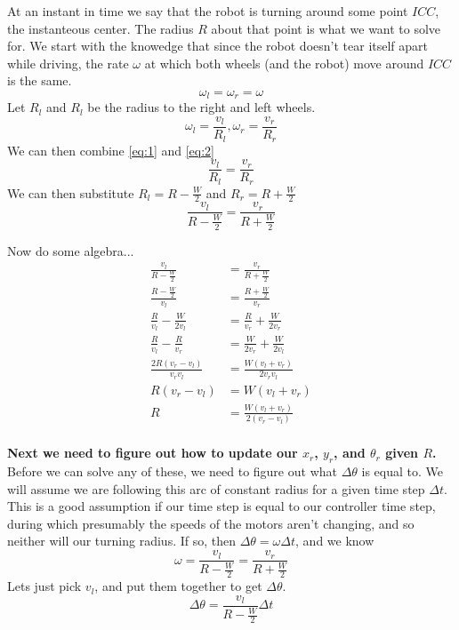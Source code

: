 \documentclass{article}
\begin{document}
At an instant in time we say that the robot is turning around some point $ICC$, the instanteous center. The radius $R$ about that point is what we want to solve for. We start with the knowedge that since the robot doesn't tear itself apart while driving, the rate $\omega$ at which both wheels (and the robot) move around $ICC$ is the same.
\begin{equation} \label{eq:1}
  \omega_l = \omega_r = \omega
\end{equation}
Let $R_l$ and $R_l$ be the radius to the right and left wheels.
\begin{equation} \label{eq:2}
  \omega_l = \frac{v_l}{R_l}, \omega_r = \frac{v_r}{R_r}
\end{equation}
We can then combine \ref{eq:1} and \ref{eq:2}
\begin{equation}
  \frac{v_l}{R_l} = \frac{v_r}{R_r}
\end{equation}
We can then substitute $R_l = R - \frac{W}{2}$ and $R_r = R + \frac{W}{2}$
\begin{equation}
  \frac{v_l}{R-\frac{W}{2}} = \frac{v_r}{R + \frac{W}{2}}
\end{equation}

Now do some algebra...
\begin{align*}
  \frac{v_l}{R-\frac{W}{2}} &= \frac{v_r}{R + \frac{W}{2}} \\[1em]
  \frac{R-\frac{W}{2}}{v_l} &= \frac{R + \frac{W}{2}}{v_r} \\[1em]
  \frac{R}{v_l}-\frac{W}{2v_l} &= \frac{R}{v_r} + \frac{W}{2v_r} \\[1em]
  \frac{R}{v_l}-\frac{R}{v_r} &= \frac{W}{2v_r}+\frac{W}{2v_l} \\[1em]
  \frac{2R(v_r-v_l)}{v_rv_l} &= \frac{W(v_l+v_r)}{2v_rv_l} \\[1em]
  R(v_r-v_l) &= W(v_l+v_r) \\[1em]
  R &= \frac{W(v_l+v_r)}{2(v_r-v_l)} \\[1em]
\end{align*}

\textbf{Next we need to figure out how to update our $x_r$, $y_r$, and $\theta_r$ given $R$.} \\

Before we can solve any of these, we need to figure out what $\Delta\theta$ is equal to. We will assume we are following this arc of constant radius for a given time step $\Delta t$. This is a good assumption if our time step is equal to our controller time step, during which presumably the speeds of the motors aren't changing, and so neither will our turning radius. If so, then $\Delta\theta = \omega\Delta t$, and we know
$$\omega=\dfrac{v_l}{R-\frac{W}{2}} = \dfrac{v_r}{R+\frac{W}{2}}$$
Lets just pick $v_l$, and put them together to get $\Delta\theta$.
$$\Delta\theta = \dfrac{v_l}{R-\frac{W}{2}}\Delta t$$
\end{document}
